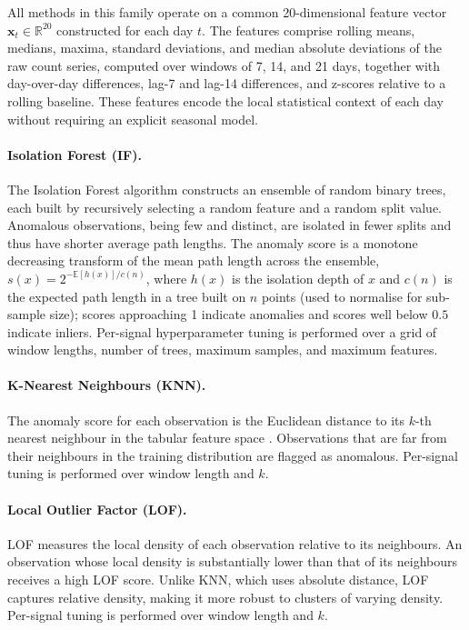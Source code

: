 \documentclass[11pt]{article}
\begin{document}
All methods in this family operate on a common 20-dimensional feature vector $\mathbf{x}_t \in \mathbb{R}^{20}$ constructed for each day $t$. The features comprise rolling means, medians, maxima, standard deviations, and median absolute deviations of the raw count series, computed over windows of 7, 14, and 21 days, together with day-over-day differences, lag-7 and lag-14 differences, and z-scores relative to a rolling baseline. These features encode the local statistical context of each day without requiring an explicit seasonal model.

\paragraph{Isolation Forest (IF).} The Isolation Forest algorithm \citep{liu2008} constructs an ensemble of random binary trees, each built by recursively selecting a random feature and a random split value. Anomalous observations, being few and distinct, are isolated in fewer splits and thus have shorter average path lengths. The anomaly score is a monotone decreasing transform of the mean path length across the ensemble, $s(x) = 2^{-\mathbb{E}[h(x)]/c(n)}$, where $h(x)$ is the isolation depth of $x$ and $c(n)$ is the expected path length in a tree built on $n$ points (used to normalise for sub-sample size); scores approaching 1 indicate anomalies and scores well below $0.5$ indicate inliers. Per-signal hyperparameter tuning is performed over a grid of window lengths, number of trees, maximum samples, and maximum features.

\paragraph{K-Nearest Neighbours (KNN).} The anomaly score for each observation is the Euclidean distance to its $k$-th nearest neighbour in the tabular feature space \citep{ramaswamy2000}. Observations that are far from their neighbours in the training distribution are flagged as anomalous. Per-signal tuning is performed over window length and $k$.

\paragraph{Local Outlier Factor (LOF).} LOF \citep{breunig2000} measures the local density of each observation relative to its neighbours. An observation whose local density is substantially lower than that of its neighbours receives a high LOF score. Unlike KNN, which uses absolute distance, LOF captures relative density, making it more robust to clusters of varying density. Per-signal tuning is performed over window length and $k$.
\end{document}
